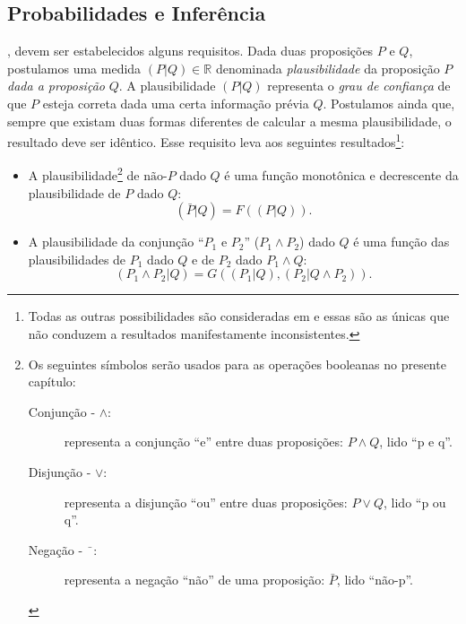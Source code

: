 \subsection{Probabilidades e Inferência}
\label{sec:probabilidadeseinferencia}
, devem ser estabelecidos alguns requisitos. Dada duas proposições $P$ e $Q$, postulamos uma medida $(P | Q) \in \mathbb{R}$ denominada \emph{plausibilidade}\cite[-6cm]{Goyal2010} da proposição $P$ \emph{dada a proposição} $Q$. A plausibilidade $(P|Q)$ representa o \emph{grau de confiança} de que $P$ esteja correta dada uma certa informação prévia $Q$. Postulamos ainda que, sempre que existam duas formas diferentes de calcular a mesma plausibilidade, o resultado deve ser idêntico. Esse requisito leva aos seguintes resultados\footnote[][-6cm]{Todas as outras possibilidades são consideradas em \citet{Tribus1969} e essas são as únicas que não conduzem a resultados manifestamente inconsistentes.}\cite[-4cm]{Tribus1969}:
\begin{itemize}
\item A plausibilidade\footnote[][-2cm]{Os seguintes símbolos serão usados para as operações booleanas no presente capítulo:
\begin{description}
 \item[Conjunção - $\wedge$:] representa a conjunção ``e'' entre duas proposições: $P\wedge Q$, lido ``p e q''.
 \item[Disjunção - $\vee$:] representa a disjunção ``ou'' entre duas proposições: $P\vee Q$, lido ``p ou q''.
 \item[Negação - $\bar{\phantom{a}}$:] representa a negação ``não'' de uma proposição: $\bar{P}$, lido ``não-p''.
\end{description}
} de $\text{não-}P$ dado $Q$ é uma função monotônica e decrescente da plausibilidade de $P$ dado $Q$: 
\[
 (\bar{P}|Q) = F(({P}|Q)).
\]
\item A plausibilidade da conjunção ``$P_1$ e $P_2$'' ($P_1\wedge P_2$) dado $Q$ é uma função das plausibilidades de $P_1$ dado $Q$ e de $P_2$ dado $P_1\wedge Q$:
\[
 (P_1\wedge P_2|Q) = G((P_1|Q), (P_2|Q\wedge P_2)).
\]
\end{itemize}


